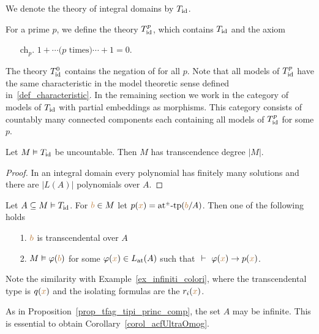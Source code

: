 We denote the theory  of integral domains by \emph{$T_{\rm id}$}.

For a prime $p$, we define the theory \emph{$T^p_{\rm id}$}, which contains $T_{\rm id}$ and the axiom
\begin{itemize}
\item[ch$_p$.]$1+\cdots \mbox{($p$ times)}\cdots +1=0$.
\end{itemize}
The theory \emph{$T^0_{\rm id}$\/} contains the negation of  for all $p$.
%
Note that all models of $T^p_{\rm id}$ have the same characteristic in the model theoretic sense defined in~\ref{def_characteristic}.
%
In the remaining section we work in the category of models of $T_{\rm id}$ with partial embeddings as morphisms.
%
This category consists of countably many connected components each containing all models of $T^p_{\rm id}$ for some $p$.


\begin{proposition}\label{prop_uncontable_trascendente}
Let $M\models T_{\rm id}$ be uncountable.
%
Then $M$ has transcendence degree $|M|$.
\end{proposition}

\begin{proof}
In an integral domain every polynomial has finitely many solutions and there are $|L(A)|$ polynomials over $A$.
\end{proof}


\begin{proposition}\label{prop_di_tipi_princ_comp}
Let $A\subseteq M\models T_{\rm id}$.
%
For ${\mr b}\in M$ let $p({\mr x})=\atpmtp({\mr b}/A)$.
%
Then one of the following holds  
\begin{itemize}
\item[1.] ${\mr b}$ is transcendental over $A$
\item[2.] $M\models\phi({\mr b})$ for some $\phi({\mr x})\in L_{\rm at}(A)$ such that
$\ \proves\ \phi({\mr x})\imp p({\mr x})$.
\end{itemize}
\end{proposition}

Note the similarity with Example~\ref{ex_infiniti_colori}, where the transcendental type is $q({\mr x})$ and the isolating formulas are the $r_i({\mr x})$.

As in Proposition~\ref{prop_tfag_tipi_princ_comp}, the set $A$ may be infinite.
%
This is essential to obtain Corollary~\ref{corol_acfUltraOmog}.

